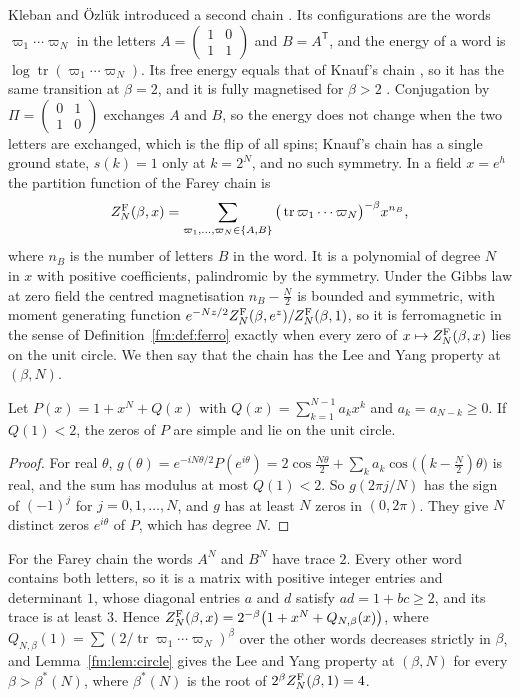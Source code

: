 Kleban and \"Ozl\"uk introduced a second chain \cite{KlebanOzluk99}. Its configurations are the words $\varpi_1\cdots\varpi_N$ in the letters $A=\begin{pmatrix}1&0\\1&1\end{pmatrix}$ and $B=A^{\mathsf T}$, and the energy of a word is $\log\operatorname{tr}(\varpi_1\cdots\varpi_N)$. Its free energy equals that of Knauf's chain \cite{FialaKO03}, so it has the same transition at $\beta=2$, and it is fully magnetised for $\beta>2$ \cite{ContucciKK99}. Conjugation by $\Pi=\begin{pmatrix}0&1\\1&0\end{pmatrix}$ exchanges $A$ and $B$, so the energy does not change when the two letters are exchanged, which is the flip of all spins; Knauf's chain has a single ground state, $s(k)=1$ only at $k=2^N$, and no such symmetry. In a field $x=e^h$ the partition function of the Farey chain is
\[
Z^{\rm F}_N(\beta,x)=\sum_{\varpi_1,\dots,\varpi_N\in\{A,B\}}\big(\operatorname{tr}\varpi_1\cdots\varpi_N\big)^{-\beta}x^{n_B},
\]
where $n_B$ is the number of letters $B$ in the word. It is a polynomial of degree $N$ in $x$ with positive coefficients, palindromic by the symmetry. Under the Gibbs law at zero field the centred magnetisation $n_B-\frac N2$ is bounded and symmetric, with moment generating function $e^{-Nz/2}Z^{\rm F}_N(\beta,e^z)/Z^{\rm F}_N(\beta,1)$, so it is ferromagnetic in the sense of Definition~\ref{fm:def:ferro} exactly when every zero of $x\mapsto Z^{\rm F}_N(\beta,x)$ lies on the unit circle. We then say that the chain has the Lee and Yang property at $(\beta,N)$.

\begin{lemma}\label{fm:lem:circle}
Let $P(x)=1+x^N+Q(x)$ with $Q(x)=\sum_{k=1}^{N-1}a_kx^k$ and $a_k=a_{N-k}\ge0$. If $Q(1)<2$, the zeros of $P$ are simple and lie on the unit circle.
\end{lemma}

\begin{proof}
For real $\theta$, $g(\theta)=e^{-iN\theta/2}P(e^{i\theta})=2\cos\frac{N\theta}2+\sum_ka_k\cos\big((k-\tfrac N2)\theta\big)$ is real, and the sum has modulus at most $Q(1)<2$. So $g(2\pi j/N)$ has the sign of $(-1)^j$ for $j=0,1,\dots,N$, and $g$ has at least $N$ zeros in $(0,2\pi)$. They give $N$ distinct zeros $e^{i\theta}$ of $P$, which has degree $N$.
\end{proof}

For the Farey chain the words $A^N$ and $B^N$ have trace $2$. Every other word contains both letters, so it is a matrix with positive integer entries and determinant $1$, whose diagonal entries $a$ and $d$ satisfy $ad=1+bc\ge2$, and its trace is at least $3$. Hence $Z^{\rm F}_N(\beta,x)=2^{-\beta}\big(1+x^N+Q_{N,\beta}(x)\big)$, where $Q_{N,\beta}(1)=\sum(2/\operatorname{tr}\varpi_1\cdots\varpi_N)^\beta$ over the other words decreases strictly in $\beta$, and Lemma~\ref{fm:lem:circle} gives the Lee and Yang property at $(\beta,N)$ for every $\beta>\beta^*(N)$, where $\beta^*(N)$ is the root of $2^\beta Z^{\rm F}_N(\beta,1)=4$.

